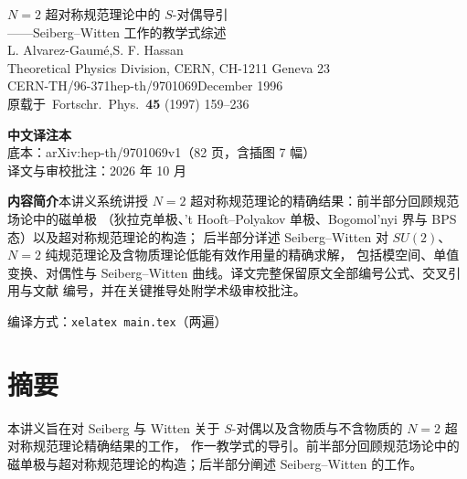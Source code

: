 \thispagestyle{empty}
\begin{center}
\vspace*{1.2cm}

{\heiti\LARGE $N=2$ 超对称规范理论中的 $S$-对偶导引}\\[10pt]
{\heiti\Large ——Seiberg--Witten 工作的教学式综述}\\[4pt]

\vspace{1.0cm}
{\large L. Alvarez-Gaum\'e,\quad S. F. Hassan}\\[6pt]
{\normalsize Theoretical Physics Division, CERN, CH-1211 Geneva 23}\\[4pt]
{\normalsize CERN-TH/96-371\quad hep-th/9701069\quad December 1996}\\[4pt]
{\normalsize 原载于\ Fortschr.\ Phys.\ \textbf{45} (1997) 159--236}

\vspace{1.2cm}
{\large\bfseries 中文译注本}\\[6pt]
{\normalsize 底本：arXiv:hep-th/9701069v1（82 页，含插图 7 幅）}\\[2pt]
{\normalsize 译文与审校批注：2026 年 10 月}

\vspace{1.0cm}
\begin{minipage}{0.86\textwidth}
\small
\textbf{内容简介}\quad 本讲义系统讲授 $N=2$ 超对称规范理论的精确结果：前半部分回顾规范场论中的磁单极
（狄拉克单极、't Hooft--Polyakov 单极、Bogomol'nyi 界与 BPS 态）以及超对称规范理论的构造；
后半部分详述 Seiberg--Witten 对 $SU(2)$、$N=2$ 纯规范理论及含物质理论低能有效作用量的精确求解，
包括模空间、单值变换、对偶性与 Seiberg--Witten 曲线。译文完整保留原文全部编号公式、交叉引用与文献
编号，并在关键推导处附学术级审校批注。
\end{minipage}

\vfill
{\small 编译方式：\texttt{xelatex main.tex}（两遍）}
\end{center}
\newpage

\section*{摘要}
本讲义旨在对 Seiberg 与 Witten 关于 $S$-对偶以及含物质与不含物质的 $N=2$ 超对称规范理论精确结果的工作，
作一教学式的导引。前半部分回顾规范场论中的磁单极与超对称规范理论的构造；后半部分阐述 Seiberg--Witten 的工作。
\medskip

